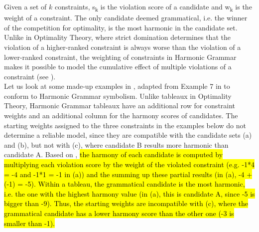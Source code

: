 Given a set of $k$ constraints, s\textsubscript{k} is the violation score of a candidate and w\textsubscript{k} is the weight of a constraint. The only candidate deemed grammatical, i.e. the winner of the competition for optimality, is the most harmonic in the candidate set. Unlike in Optimality Theory, where strict domination determines that the violation of a higher-ranked constraint is always worse than the violation of a lower-ranked constraint, the weighting of constraints in Harmonic Grammar makes it possible to model the cumulative effect of multiple violations of a constraint (see ). \\
Let us look at some made-up examples in , adapted from Example 7 in \textcite{kuhn2002corpus} to conform to Harmonic Grammar symbolism. Unlike tableaux in Optimality Theory, Harmonic Grammar tableaux have an additional row for constraint weights and an additional column for the harmony scores of candidates. The starting weights assigned to the three constraints in the examples below do not determine a reliable model, since they are compatible with the candidate sets (a) and (b), but not with (c), where candidate B results more harmonic than candidate A.  Based on , \hl{the harmony of each candidate is computed by multiplying each violation score by the weight of the violated constraint (e.g. -1*4 = -4 and -1*1 = -1 in (a)) and the summing up these partial results (in (a), -4 + (-1) = -5). Within a tableau, the grammatical candidate is the most harmonic, i.e. the one with the highest harmony value (in (a), this is candidate A, since -5 is bigger than -9). Thus, the starting weights are incompatible with (c), where the grammatical candidate has a lower harmony score than the other one (-3 is smaller than -1).}


